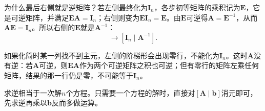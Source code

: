 为什么最后右侧就是逆矩阵？若左侧最终化为$\bm I_n$，各步初等矩阵的乘积记为$\bm E$，它是可逆矩阵，并满足$\bm E\bm A=\bm I_n$；右侧则变为$\bm E\bm I_n=\bm E$。由$\bm E$可逆得$\bm A=\bm E^{-1}$，从而$\bm A\bm E=\bm I_n$。所以右侧的$\bm E$就是$\bm A^{-1}$：
\begin{equation}
 [\bm A\mid\bm I_n]\longrightarrow[\bm I_n\mid\bm A^{-1}].
 \label{eq:ls-gauss-jordan-inverse}
\end{equation}

如果化简时某一列找不到主元，左侧的阶梯形会出现零行，不能化为$\bm I_n$。这时$\bm A$没有逆：若$\bm A$可逆，则$\bm E\bm A$作为两个可逆矩阵之积也可逆；但有零行的矩阵左乘任何矩阵，结果的那一行仍是零，不可能等于$\bm I_n$。

求逆相当于一次解$n$个方程。只需要一个方程的解时，直接对$[\bm A\mid\bm b]$消元即可，先求逆再乘以$\bm b$反而多做运算。
